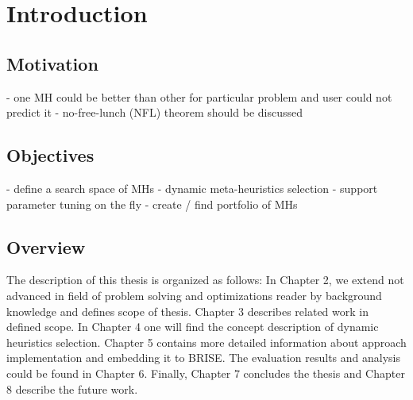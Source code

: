 \chapter{Introduction}\label{intro}


\section{Motivation}
- one MH could be better than other for particular problem and user could not predict it \cite{surv:kerschke2019automated}
- no-free-lunch (NFL) theorem should be discussed


\section{Objectives}
- define a search space of MHs - dynamic meta-heuristics selection
- support parameter tuning on the fly
- create / find portfolio of MHs

  	
\section{Overview}
The description of this thesis is organized as follows: In Chapter 2, we extend not advanced in field of problem solving and optimizations reader by background knowledge and defines scope of thesis. Chapter 3 describes related work in defined scope. In Chapter 4 one will find the concept description of dynamic heuristics selection. Chapter 5 contains more detailed information about approach implementation and  embedding it to BRISE. The evaluation results and analysis could be found in Chapter 6. Finally, Chapter 7 concludes the thesis and Chapter 8 describe the future work.
